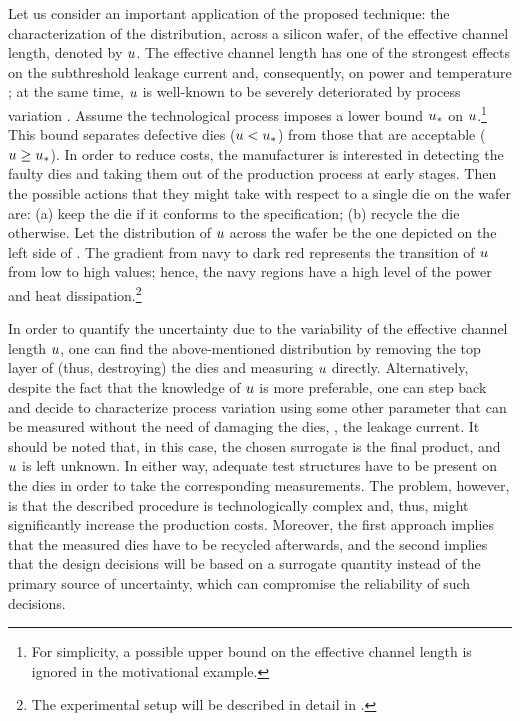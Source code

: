 
Let us consider an important application of the proposed technique: the characterization of the distribution, across a silicon wafer, of the effective channel length, denoted by $u$. The effective channel length has one of the strongest effects on the subthreshold leakage current and, consequently, on power and temperature \cite{juan2012}; at the same time, $u$ is well-known to be severely deteriorated by process variation \cite{chandrakasan2001, srivastava2010}.
Assume the technological process imposes a lower bound $u_*$ on $u$.\footnote{For simplicity, a possible upper bound on the effective channel length is ignored in the motivational example.} This bound separates defective dies ($u < u_*$) from those that are acceptable ($u \geq u_*$).
In order to reduce costs, the manufacturer is interested in detecting the faulty dies and taking them out of the production process at early stages.
Then the possible actions that they might take with respect to a single die on the wafer are: (a) keep the die if it conforms to the specification; (b) recycle the die otherwise.
Let the distribution of $u$ across the wafer be the one depicted on the left side of .
The gradient from navy to dark red represents the transition of $u$ from low to high values; hence, the navy regions have a high level of the power and heat dissipation.\footnote{The experimental setup will be described in detail in .}

In order to quantify the uncertainty due to the variability of the effective channel length $u$, one can find the above-mentioned distribution by removing the top layer of (thus, destroying) the dies and measuring $u$ directly.
Alternatively, despite the fact that the knowledge of $u$ is more preferable, one can step back and decide to characterize process variation using some other parameter that can be measured without the need of damaging the dies, \eg, the leakage current.
It should be noted that, in this case, the chosen surrogate is the final product, and $u$ is left unknown.
In either way, adequate test structures have to be present on the dies in order to take the corresponding measurements.
The problem, however, is that the described procedure is technologically complex and, thus, might significantly increase the production costs.
Moreover, the first approach implies that the measured dies have to be recycled afterwards, and the second implies that the design decisions will be based on a surrogate quantity instead of the primary source of uncertainty, which can compromise the reliability of such decisions.

